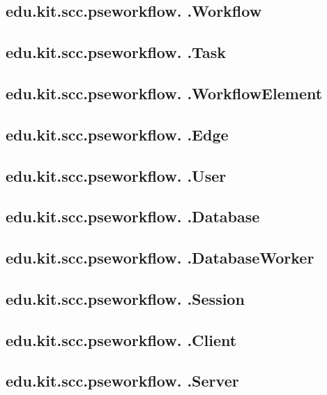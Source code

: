         \subsection{edu.kit.scc.pseworkflow.   .Workflow}    
        \subsection{edu.kit.scc.pseworkflow.   .Task}
        \subsection{edu.kit.scc.pseworkflow.   .WorkflowElement}
        \subsection{edu.kit.scc.pseworkflow.   .Edge}
        \subsection{edu.kit.scc.pseworkflow.   .User}
        
        \subsection{edu.kit.scc.pseworkflow.   .Database}
        \subsection{edu.kit.scc.pseworkflow.   .DatabaseWorker}
        
        \subsection{edu.kit.scc.pseworkflow.   .Session}
        \subsection{edu.kit.scc.pseworkflow.   .Client}
        \subsection{edu.kit.scc.pseworkflow.   .Server}
        